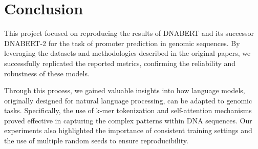 \section{Conclusion}

This project focused on reproducing the results of DNABERT and its successor DNABERT-2 for the task of promoter prediction in genomic sequences. By leveraging the datasets and methodologies described in the original papers, we successfully replicated the reported metrics, confirming the reliability and robustness of these models.

Through this process, we gained valuable insights into how language models, originally designed for natural language processing, can be adapted to genomic tasks. Specifically, the use of k-mer tokenization and self-attention mechanisms proved effective in capturing the complex patterns within DNA sequences. Our experiments also highlighted the importance of consistent training settings and the use of multiple random seeds to ensure reproducibility.


